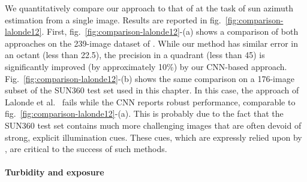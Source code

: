 We quantitatively compare our approach to that of \cite{lalonde-ijcv-12} at the task of sun azimuth estimation from a single image. Results are reported in fig.~\ref{fig:comparison-lalonde12}. First, fig.~\ref{fig:comparison-lalonde12}-(a) shows a comparison of both approaches on the 239-image dataset of \cite{lalonde-ijcv-12}. While our method has similar error in an octant (less than 22.5\degree), the precision in a quadrant (less than 45\degree) is significantly improved (by approximately 10\%) by our CNN-based approach. Fig.~\ref{fig:comparison-lalonde12}-(b) shows the same comparison on a 176-image subset of the SUN360 test set used in this chapter. In this case, the approach of Lalonde et al.~\cite{lalonde-ijcv-12} fails while the CNN reports robust performance, comparable to fig.~\ref{fig:comparison-lalonde12}-(a). This is probably due to the fact that the SUN360 test set contains much more challenging images that are often devoid of strong, explicit illumination cues. These cues, which are expressly relied upon by \cite{lalonde-ijcv-12}, are critical to the success of such methods.
\paragraph{Turbidity and exposure}


